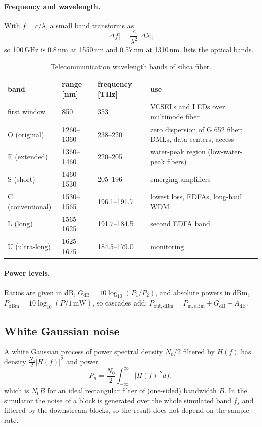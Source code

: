 \paragraph{Frequency and wavelength.} With $f=c/\lambda$, a small band transforms as
\begin{equation}
  |\Delta f|=\frac{c}{\lambda^2}|\Delta\lambda|,
\end{equation}
so 100\,GHz is 0.8\,nm at 1550\,nm and 0.57\,nm at 1310\,nm.  lists the optical
bands.

\begin{table}[htbp]
\centering\small
\caption{Telecommunication wavelength bands of silica fiber.}
\label{tab:bands}
\begin{tabularx}{\textwidth}{@{}lllX@{}}
\toprule
band & range [nm] & frequency [THz] & use\\
\midrule
first window & 850 & 353 & VCSELs and LEDs over multimode fiber\\
O (original) & 1260--1360 & 238--220 & zero dispersion of G.652 fiber; DMLs, data centers, access\\
E (extended) & 1360--1460 & 220--205 & water-peak region (low-water-peak fibers)\\
S (short) & 1460--1530 & 205--196 & emerging amplifiers\\
C (conventional) & 1530--1565 & 196.1--191.7 & lowest loss, EDFAs, long-haul WDM\\
L (long) & 1565--1625 & 191.7--184.5 & second EDFA band\\
U (ultra-long) & 1625--1675 & 184.5--179.0 & monitoring\\
\bottomrule
\end{tabularx}
\end{table}

\paragraph{Power levels.} Ratios are given in dB, $G_{\mathrm{dB}}=10\log_{10}(P_1/P_2)$, and absolute
powers in dBm, $P_{\mathrm{dBm}}=10\log_{10}(P/1\,\mathrm{mW})$, so cascades add:
$P_{\mathrm{out,dBm}}=P_{\mathrm{in,dBm}}+G_{\mathrm{dB}}-A_{\mathrm{dB}}$.

\subsection{White Gaussian noise}
A white Gaussian process of power spectral density $N_0/2$ filtered by $H(f)$ has density
$\frac{N_0}2|H(f)|^2$ and power
\begin{equation}
  P_{n}=\frac{N_0}{2}\int_{-\infty}^{\infty}|H(f)|^2df,
\end{equation}
which is $N_0B$ for an ideal rectangular filter of (one-sided) bandwidth $B$. In the simulator
the noise of a block is generated over the whole simulated band $f_s$ and filtered by the
downstream blocks, so the result does not depend on the sample rate.

